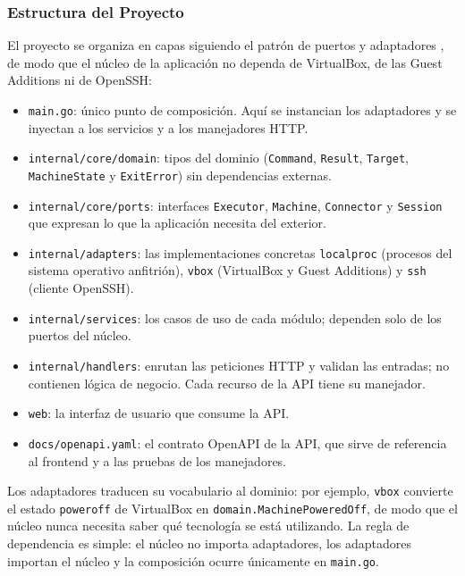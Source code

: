 \subsubsection{Estructura del Proyecto}
\label{sec:estructura-proyecto}

El proyecto se organiza en capas siguiendo el patrón de puertos y
adaptadores \parencite{cockburn}, de modo que el núcleo de la
aplicación no dependa de VirtualBox, de las Guest Additions ni de
OpenSSH:

\begin{itemize}
  \item \texttt{main.go}: único punto de composición. Aquí se
  instancian los adaptadores y se inyectan a los servicios y a los
  manejadores HTTP.
  \item \texttt{internal/core/domain}: tipos del dominio
  (\texttt{Command}, \texttt{Result}, \texttt{Target},
  \texttt{MachineState} y \texttt{ExitError}) sin dependencias externas.
  \item \texttt{internal/core/ports}: interfaces \texttt{Executor},
  \texttt{Machine}, \texttt{Connector} y \texttt{Session} que expresan lo
  que la aplicación necesita del exterior.
  \item \texttt{internal/adapters}: las implementaciones concretas
  \texttt{localproc} (procesos del sistema operativo anfitrión),
  \texttt{vbox} (VirtualBox y Guest Additions) y \texttt{ssh} (cliente
  OpenSSH).
  \item \texttt{internal/services}: los casos de uso de cada módulo;
  dependen solo de los puertos del núcleo.
  \item \texttt{internal/handlers}: enrutan las peticiones HTTP y
  validan las entradas; no contienen lógica de negocio. Cada recurso de
  la API tiene su manejador.
  \item \texttt{web}: la interfaz de usuario que consume la API.
  \item \texttt{docs/openapi.yaml}: el contrato OpenAPI de la API, que
  sirve de referencia al frontend y a las pruebas de los manejadores.
\end{itemize}

Los adaptadores traducen su vocabulario al dominio: por ejemplo,
\texttt{vbox} convierte el estado \texttt{poweroff} de VirtualBox en
\texttt{domain.MachinePoweredOff}, de modo que el núcleo nunca necesita
saber qué tecnología se está utilizando. La regla de dependencia es
simple: el núcleo no importa adaptadores, los adaptadores importan el
núcleo y la composición ocurre únicamente en \texttt{main.go}.

